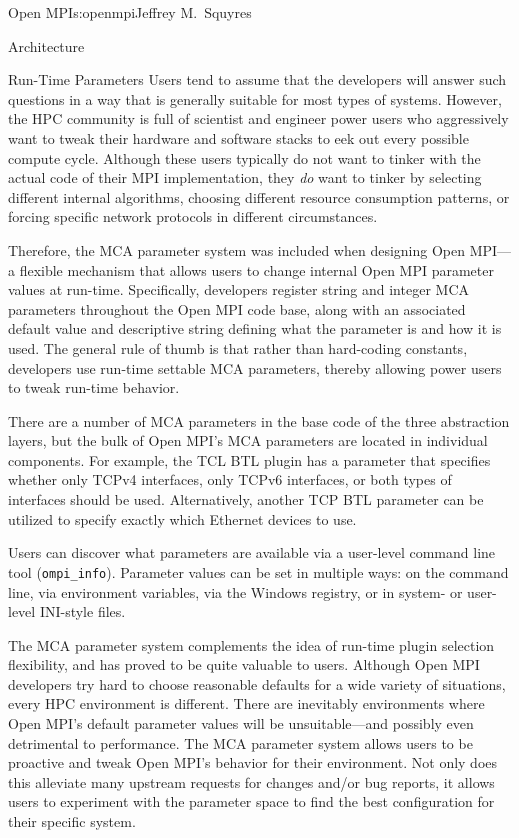 \begin{aosachapter}{Open MPI}{s:openmpi}{Jeffrey M.\ Squyres}
\begin{aosasect1}{Architecture}
\begin{aosasect2}{Run-Time Parameters}
Users tend to assume that the developers will answer such questions in
a way that is generally suitable for most types of systems.
%
However, the HPC community is full of scientist and engineer power
users who aggressively want to tweak their hardware and software
stacks to eek out every possible compute cycle.
%
Although these users typically do not want to tinker with the actual
code of their MPI implementation, they \emph{do} want to tinker by
selecting different internal algorithms, choosing different resource
consumption patterns, or forcing specific network protocols in
different circumstances.

Therefore, the MCA parameter system was included when designing Open
MPI---a flexible mechanism that allows users to change internal Open
MPI parameter values at run-time.
%
Specifically, developers register string and integer MCA parameters
throughout the Open MPI code base, along with an associated default
value and descriptive string defining what the parameter is and how it
is used.
%
The general rule of thumb is that rather than hard-coding constants,
developers use run-time settable MCA parameters, thereby allowing
power users to tweak run-time behavior.

There are a number of MCA parameters in the base code of the three
abstraction layers, but the bulk of Open MPI's MCA parameters are
located in individual components.
%
For example, the TCL BTL plugin has a parameter that specifies whether
only TCPv4 interfaces, only TCPv6 interfaces, or both types of
interfaces should be used.
%
Alternatively, another TCP BTL parameter can be utilized to specify
exactly which Ethernet devices to use.

Users can discover what parameters are available via a user-level
command line tool ({\tt ompi\_\-info}).
%
Parameter values can be set in multiple ways: on the command line, via
environment variables, via the Windows registry, or in system- or
user-level INI-style files.

The MCA parameter system complements the idea of run-time plugin
selection flexibility, and has proved to be quite valuable to users.
%
Although Open MPI developers try hard to choose reasonable defaults
for a wide variety of situations, every HPC environment is different.
There are inevitably environments where Open MPI's default parameter
values will be unsuitable---and possibly even detrimental to
performance.
%
The MCA parameter system allows users to be proactive and tweak Open
MPI's behavior for their environment.  Not only does this alleviate
many upstream requests for changes and/or bug reports, it allows users
to experiment with the parameter space to find the best configuration
for their specific system.


\end{aosasect2}
\end{aosasect1}
\end{aosachapter}
